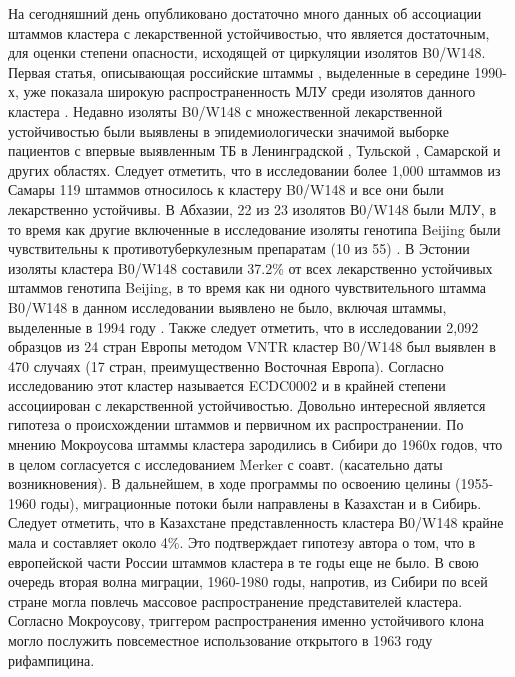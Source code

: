 На сегодняшний день опубликовано достаточно много данных об ассоциации штаммов кластера с лекарственной устойчивостью, что является достаточным, для оценки степени опасности, исходящей от циркуляции изолятов B0/W148. Первая статья, описывающая российские штаммы , выделенные в середине 1990-х, уже показала широкую распространенность МЛУ среди изолятов данного кластера \cite{marttila1998ser315thr}. Недавно изоляты B0/W148 с множественной лекарственной устойчивостью были выявлены в эпидемиологически значимой выборке пациентов с впервые выявленным ТБ в Ленинградской \cite{tratata123}, Тульской \cite{dubiley2010molecular}, Самарской и других областях. Следует отметить, что в исследовании более 1,000 штаммов из Самары 119 штаммов относилось к кластеру B0/W148 и все они были лекарственно устойчивы. В Абхазии, 22 из 23 изолятов В0/W148 были МЛУ, в то время как другие включенные в исследование изоляты генотипа Beijing были чувствительны к противотуберкулезным препаратам (10 из 55) \cite{pardini2009characteristics}. В Эстонии изоляты кластера B0/W148 составили 37.2\% от всех лекарственно устойчивых штаммов генотипа Beijing, в то время как ни одного чувствительного штамма B0/W148 в данном исследовании выявлено не было, включая штаммы, выделенные в 1994 году \cite{kruuner2001spread}. Также следует отметить, что в исследовании 2,092 образцов из 24 стран Европы методом VNTR кластер B0/W148 был выявлен в 470 случаях (17 стран, преимущественно Восточная Европа). Согласно исследованию этот кластер называется ECDC0002 и в крайней степени ассоциирован с лекарственной устойчивостью.
Довольно интересной является гипотеза о происхождении штаммов и первичном их распространении. По мнению Мокроусова штаммы кластера зародились в Сибири до 1960х годов, что в целом согласуется с исследованием Merker с соавт. (касательно даты возникновения). В дальнейшем, в ходе программы по освоению целины (1955-1960 годы), миграционные потоки были направлены в Казахстан и в Сибирь. Следует отметить, что в Казахстане представленность кластера В0/W148 крайне мала и составляет около 4\%. Это подтверждает гипотезу автора о том, что в европейской части России штаммов кластера в те годы еще не было. В свою очередь вторая волна миграции, 1960-1980 годы, напротив, из Сибири по всей стране могла повлечь массовое распространение представителей кластера. Согласно Мокроусову, триггером распространения именно устойчивого клона могло послужить повсеместное использование открытого в 1963 году рифампицина.
 
